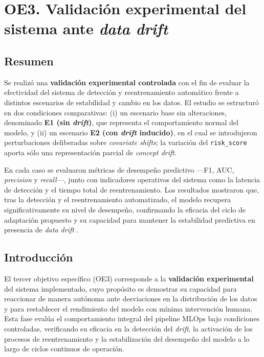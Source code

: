 
\section{OE3. Validación experimental del sistema ante \textit{data drift}}
\label{sec:oe3}
\subsection*{Resumen}

Se realizó una \textbf{validación experimental controlada} con el fin de evaluar la efectividad del sistema de detección y reentrenamiento automático frente a distintos escenarios de estabilidad y cambio en los datos.  
El estudio se estructuró en dos condiciones comparativas:  
(i) un escenario base sin alteraciones, denominado \textbf{E1 (sin \textit{drift})}, que representa el comportamiento normal del modelo, y  
(ii) un escenario \textbf{E2 (con \textit{drift} inducido)}, en el cual se introdujeron perturbaciones deliberadas sobre \textit{covariate shifts}; la variación del \texttt{risk\_score} aporta sólo una representación parcial de \textit{concept drift}.  

En cada caso se evaluaron métricas de desempeño predictivo —F1, AUC, \textit{precision} y \textit{recall}—, junto con indicadores operativos del sistema como la latencia de detección y el tiempo total de reentrenamiento.  
Los resultados mostraron que, tras la detección y el reentrenamiento automatizado, el modelo recupera significativamente su nivel de desempeño, confirmando la eficacia del ciclo de adaptación propuesto y su capacidad para mantener la estabilidad predictiva en presencia de \textit{data drift} \citep{Singh2023,Chatterjee2023,Lu2019}.


\subsection{Introducción}

El tercer objetivo específico (OE3) corresponde a la \textbf{validación experimental} del sistema implementado, cuyo propósito es demostrar su capacidad para reaccionar de manera autónoma ante desviaciones en la distribución de los datos y para restablecer el rendimiento del modelo con mínima intervención humana.  
Esta fase evalúa el comportamiento integral del pipeline MLOps bajo condiciones controladas, verificando su eficacia en la detección del \textit{drift}, la activación de los procesos de reentrenamiento y la estabilización del desempeño del modelo a lo largo de ciclos continuos de operación.

